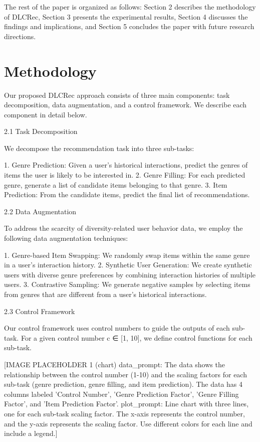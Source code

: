 \documentclass[12pt,letterpaper]{article}
\begin{document}
The rest of the paper is organized as follows: Section 2 describes the methodology of DLCRec, Section 3 presents the experimental results, Section 4 discusses the findings and implications, and Section 5 concludes the paper with future research directions.

\section{Methodology}

Our proposed DLCRec approach consists of three main components: task decomposition, data augmentation, and a control framework. We describe each component in detail below.

2.1 Task Decomposition

We decompose the recommendation task into three sub-tasks:

1. Genre Prediction: Given a user's historical interactions, predict the genres of items the user is likely to be interested in.
2. Genre Filling: For each predicted genre, generate a list of candidate items belonging to that genre.
3. Item Prediction: From the candidate items, predict the final list of recommendations.

2.2 Data Augmentation

To address the scarcity of diversity-related user behavior data, we employ the following data augmentation techniques:

1. Genre-based Item Swapping: We randomly swap items within the same genre in a user's interaction history.
2. Synthetic User Generation: We create synthetic users with diverse genre preferences by combining interaction histories of multiple users.
3. Contrastive Sampling: We generate negative samples by selecting items from genres that are different from a user's historical interactions.

2.3 Control Framework

Our control framework uses control numbers to guide the outputs of each sub-task. For a given control number c ∈ [1, 10], we define control functions for each sub-task.

[IMAGE PLACEHOLDER 1 (chart)
data_prompt: The data shows the relationship between the control number (1-10) and the scaling factors for each sub-task (genre prediction, genre filling, and item prediction). The data has 4 columns labeled 'Control Number', 'Genre Prediction Factor', 'Genre Filling Factor', and 'Item Prediction Factor'.
plot_prompt: Line chart with three lines, one for each sub-task scaling factor. The x-axis represents the control number, and the y-axis represents the scaling factor. Use different colors for each line and include a legend.]
\end{document}
